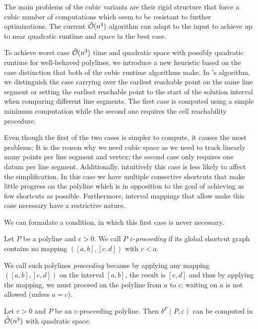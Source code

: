 The main problems of the cubic variants are their rigid structure that force a cubic number of computations which seem to be resistant to further optimizations. The current \(\hat{\mathcal{O}}(n^4)\) algorithm can adapt to the input to achieve up to near quadratic runtime and space in the best case.

To achieve worst case \(\hat{\mathcal{O}}(n^3)\) time and quadratic space with possibly quadratic runtime for well-behaved polylines, we introduce a new heuristic based on the case distinction that both of the cubic runtime algorithms make. In \citeauthor{polyline_simplification_has_cubic_complexity_bringmannetal}'s algorithm, we distinguish the case carrying over the earliest reachable point on the same line segment or setting the earliest reachable point to the start of the solution interval when comparing different line segments. The first case is computed using a simple minimum computation while the second one requires the cell reachability procedure.

Even though the first of the two cases is simpler to compute, it causes the most problems: It is the reason why we need cubic space as we need to track linearly many points per line segment and vertex; the second case only requires one datum per line segment. Additionally, intuitively this case is less likely to affect the simplification. In this case we have multiple consective shortcuts that make little progress on the polyline which is in opposition to the goal of achieving as few shortcuts as possible. Furthermore, interval mappings that allow make this case necessary have a restrictive nature. 

We can formulate a condition, in which this first case is never necessary.
\begin{definition}
	Let \(P\) be a polyline and \(\varepsilon > 0\). We call \(P\) \(\varepsilon\)-\emph{proceeding} if its global shortcut graph contains no mapping \(([a, b], [c, d])\) with \(c < a\).
\end{definition}

We call such polylines \emph{proceeding} because by applying any mapping \(([a, b], [c, d])\) on the interval \([a, b]\), the result is \([c, d]\) and thus by applying the mapping, we must proceed on the polyline from \(a\) to \(c\); waiting on \(a\) is not allowed (unless \(a = c\)).

\begin{theorem}
	Let \(\varepsilon > 0\) and \(P\) be an \(\varepsilon\)-proceeding polyline. Then \(\delta^F(P, \varepsilon)\) can be computed in \(\hat{\mathcal{O}}(n^3)\) with quadratic space.
\end{theorem}

